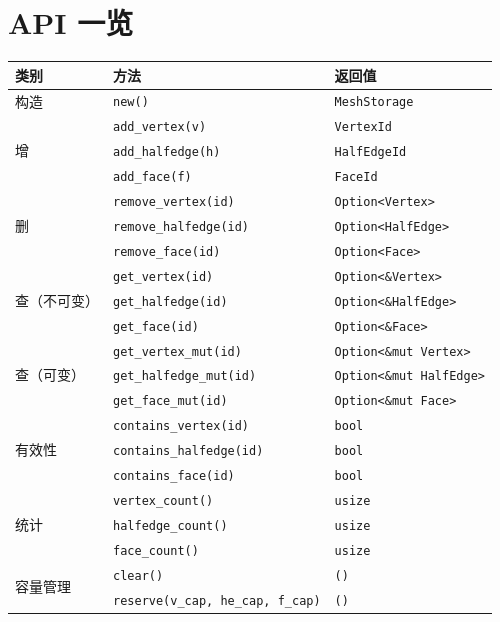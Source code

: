 \documentclass[11pt,a4paper]{article}
\begin{document}
\section{API 一览}

\begin{center}
\renewcommand{\arraystretch}{1.18}
\begin{tabular}{@{}lll@{}}
  \toprule
  \textbf{类别} & \textbf{方法} & \textbf{返回值} \\
  \midrule
  构造 & \texttt{new()} & \texttt{MeshStorage} \\
  \midrule
  \multirow{3}{*}{增}
    & \texttt{add\_vertex(v)}    & \texttt{VertexId}   \\
    & \texttt{add\_halfedge(h)}  & \texttt{HalfEdgeId} \\
    & \texttt{add\_face(f)}      & \texttt{FaceId}     \\
  \midrule
  \multirow{3}{*}{删}
    & \texttt{remove\_vertex(id)}    & \texttt{Option<Vertex>}   \\
    & \texttt{remove\_halfedge(id)}  & \texttt{Option<HalfEdge>}  \\
    & \texttt{remove\_face(id)}      & \texttt{Option<Face>}      \\
  \midrule
  \multirow{3}{*}{查（不可变）}
    & \texttt{get\_vertex(id)}       & \texttt{Option<\&Vertex>}    \\
    & \texttt{get\_halfedge(id)}     & \texttt{Option<\&HalfEdge>}  \\
    & \texttt{get\_face(id)}         & \texttt{Option<\&Face>}      \\
  \midrule
  \multirow{3}{*}{查（可变）}
    & \texttt{get\_vertex\_mut(id)}  & \texttt{Option<\&mut Vertex>}   \\
    & \texttt{get\_halfedge\_mut(id)}& \texttt{Option<\&mut HalfEdge>} \\
    & \texttt{get\_face\_mut(id)}    & \texttt{Option<\&mut Face>}     \\
  \midrule
  \multirow{3}{*}{有效性}
    & \texttt{contains\_vertex(id)}    & \texttt{bool} \\
    & \texttt{contains\_halfedge(id)}  & \texttt{bool} \\
    & \texttt{contains\_face(id)}      & \texttt{bool} \\
  \midrule
  \multirow{3}{*}{统计}
    & \texttt{vertex\_count()}   & \texttt{usize} \\
    & \texttt{halfedge\_count()} & \texttt{usize} \\
    & \texttt{face\_count()}     & \texttt{usize} \\
  \midrule
  \multirow{2}{*}{容量管理}
    & \texttt{clear()}    & \texttt{()} \\
    & \texttt{reserve(v\_cap, he\_cap, f\_cap)} & \texttt{()} \\
  \bottomrule
\end{tabular}
\end{center}
\end{document}
